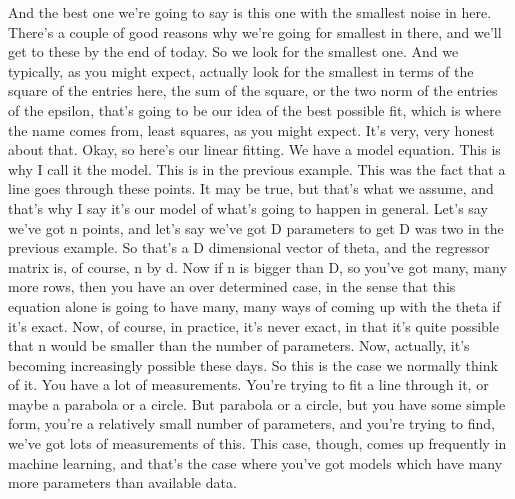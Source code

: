 \documentclass[11pt,a4paper]{article}
\begin{document}
And the best one we're going to say is this one with the smallest noise in here. There's a couple of good reasons why we're going for smallest in there, and we'll get to these by the end of today. So we look for the smallest one. And we typically, as you might expect, actually look for the smallest in terms of the square of the entries here, the sum of the square, or the two norm of the entries of the epsilon, that's going to be our idea of the best possible fit, which is where the name comes from, least squares, as you might expect. It's very, very honest about that. Okay, so here's our linear fitting. We have a model equation. This is why I call it the model. This is in the previous example. This was the fact that a line goes through these points. It may be true, but that's what we assume, and that's why I say it's our model of what's going to happen in general. Let's say we've got n points, and let's say we've got D parameters to get D was two in the previous example. So that's a D dimensional vector of theta, and the regressor matrix is, of course, n by d. Now if n is bigger than D, so you've got many, many more rows, then you have an over determined case, in the sense that this equation alone is going to have many, many ways of coming up with the theta if it's exact. Now, of course, in practice, it's never exact, in that it's quite possible that n would be smaller than the number of parameters. Now, actually, it's becoming increasingly possible these days. So this is the case we normally think of it. You have a lot of measurements. You're trying to fit a line through it, or maybe a parabola or a circle. But parabola or a circle, but you have some simple form, you're a relatively small number of parameters, and you're trying to find, we've got lots of measurements of this. This case, though, comes up frequently in machine learning, and that's the case where you've got models which have many more parameters than available data.
\end{document}
